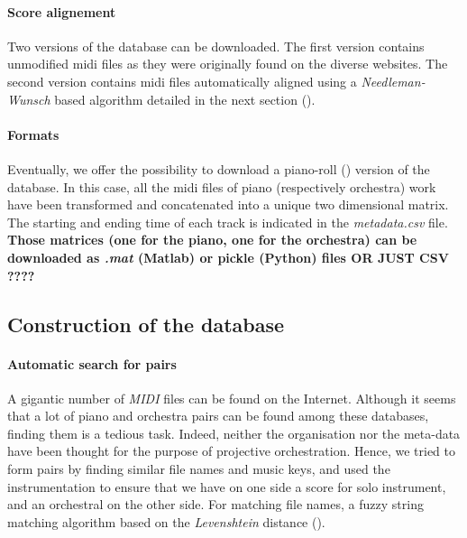 \documentclass[twoside,twocolumn]{article}
\begin{document}
\paragraph{Score alignement}
Two versions of the database can be downloaded. The first version contains unmodified midi files as they were originally found on the diverse websites. The second version contains midi files automatically aligned using a \textit{Needleman-Wunsch} \cite{NEEDLEMAN1970443} based  algorithm detailed in the next section ().

\paragraph{Formats}
Eventually, we offer the possibility to download a piano-roll () version of the database. In this case, all the midi files of piano (respectively orchestra) work have been transformed and concatenated into a unique two dimensional matrix. The starting and ending time of each track is indicated in the \textit{metadata.csv} file. \textbf{Those matrices (one for the piano, one for the orchestra) can be downloaded as \textit{.mat} (Matlab) or pickle (Python) files OR JUST CSV ????}

\subsection{Construction of the database}
\paragraph{Automatic search for pairs}
A gigantic number of \textit{MIDI} files can be found on the Internet.
Although it seems that a lot of piano and orchestra pairs can be found among these databases,
finding them is a tedious task. Indeed, neither the organisation nor the meta-data have been thought for the purpose of projective orchestration.
 Hence, we tried to form pairs by finding similar file names and music keys, and used the instrumentation to ensure that we have on one side a score for solo instrument, and an orchestral on the other side. 
For matching file names, a fuzzy string matching algorithm based on the \textit{Levenshtein} distance (\cite{fuzzywuzzy}).

\end{document}
